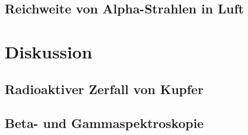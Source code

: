 \documentclass[12pt,a4paper]{article}
\begin{document}
\begin{multicols}{2}
\subsection{Reichweite von Alpha-Strahlen in Luft}



\pagebreak
\section{Diskussion}

\subsection{Radioaktiver Zerfall von Kupfer}

\subsection{Beta- und Gammaspektroskopie}


\end{multicols}
\end{document}
